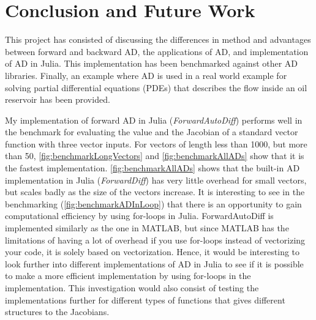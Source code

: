 \chapter{Conclusion and Future Work}
\label{ch:Conclusion}
This project has consisted of discussing the differences in method and advantages between forward and backward AD, the applications of AD, and implementation of AD in Julia. This implementation has been benchmarked against other AD libraries. Finally, an example where AD is used in a real world example for solving partial differential equations (PDEs) that describes the flow inside an oil reservoir has been provided.


My implementation of forward AD in Julia (\textit{ForwardAutoDiff}) performs well in the benchmark for evaluating the value and the Jacobian of a standard vector function with three vector inputs. For vectors of length less than 1000, but more than 50, \autoref{fig:benchmarkLongVectors} and \autoref{fig:benchmarkAllADs} show that it is the fastest implementation. \autoref{fig:benchmarkAllADs} shows that the built-in AD implementation in Julia (\textit{ForwardDiff}) has very little overhead for small vectors, but scales badly as the size of the vectors increase. It is interesting to see in the benchmarking (\autoref{fig:benchmarkADInLoop}) that there is an opportunity to gain computational efficiency by using for-loops in Julia. ForwardAutoDiff is implemented similarly as the one in MATLAB, but since MATLAB has the limitations of having a lot of overhead if you use for-loops instead of vectorizing your code, it is solely based on vectorization. Hence, it would be interesting to look further into different implementations of AD in Julia to see if it is possible to make a more efficient implementation by using for-loops in the implementation. This investigation would also consist of testing the implementations further for different types of functions that gives different structures to the Jacobians. 


